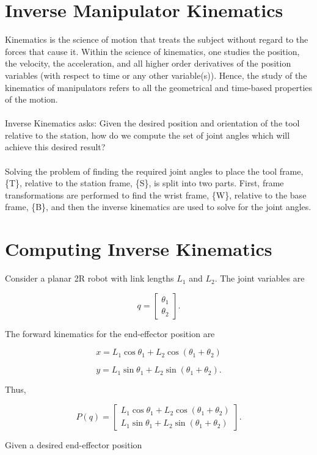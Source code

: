 \documentclass{article}
\begin{document}
\section{Inverse Manipulator Kinematics}
Kinematics is the science of motion that treats the subject without regard to the
forces that cause it. Within the science of kinematics, one studies the position, the
velocity, the acceleration, and all higher order derivatives of the position variables
(with respect to time or any other variable(s)). Hence, the study of the kinematics of
manipulators refers to all the geometrical and time-based properties of the motion.
\\\\
Inverse Kinematics asks: Given the desired position and orientation of the tool relative to the
station, how do we compute the set of joint angles which will achieve this desired
result? \\\\
Solving the problem of finding the required joint angles to place the tool
frame, \{T\}, relative to the station frame, \{S\}, is split into two parts. First, frame
transformations are performed to find the wrist frame, \{W\}, relative to the base
frame, \{B\}, and then the inverse kinematics are used to solve for the joint angles.


\section{Computing Inverse Kinematics}

Consider a planar 2R robot with link lengths $L_1$ and $L_2$.
The joint variables are

\[
q =
\begin{bmatrix}
\theta_1\\
\theta_2
\end{bmatrix}.
\]

The forward kinematics for the end-effector position are

\[
x =
L_1\cos\theta_1
+
L_2\cos(\theta_1+\theta_2)
\]

\[
y =
L_1\sin\theta_1
+
L_2\sin(\theta_1+\theta_2).
\]

Thus,

\[
P(q) =
\begin{bmatrix}
L_1\cos\theta_1 + L_2\cos(\theta_1+\theta_2)\\
L_1\sin\theta_1 + L_2\sin(\theta_1+\theta_2)
\end{bmatrix}.
\]

Given a desired end-effector position
\end{document}
